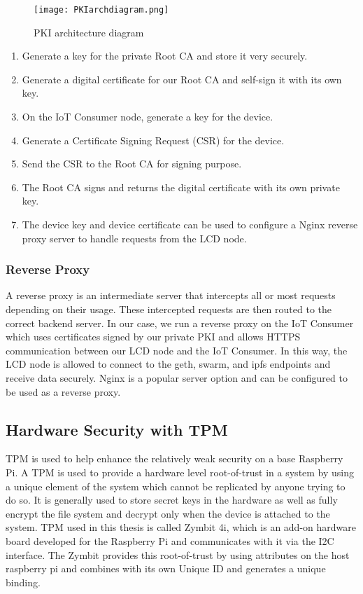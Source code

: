\documentclass[11pt,openright]{report}
\begin{document}
\begin{figure}
	\centering
	\texttt{[image: PKIarchdiagram.png]}
	\caption{PKI architecture diagram}
	\label{fig:pkiarch}
\end{figure}


\begin{enumerate}
	\item Generate a key for the private Root CA and store it very securely.
	\item Generate a digital certificate for our Root CA and self-sign it with its own key.
	\item On the IoT Consumer node, generate a key for the device.
	\item Generate a Certificate Signing Request (CSR) for the device.
	\item Send the CSR to the Root CA for signing purpose.
	\item The Root CA signs and returns the digital certificate with its own private key.
	\item The device key and device certificate can be used to configure a Nginx reverse proxy server to handle requests from the LCD node.
\end{enumerate}


\subsubsection{Reverse Proxy}
A reverse proxy is an intermediate server that intercepts all or most requests depending on their usage. These intercepted requests are then routed to the correct backend server. In our case, we run a reverse proxy on the IoT Consumer which uses certificates signed by our private PKI and allows HTTPS communication between our LCD node and the IoT Consumer. In this way, the LCD node is allowed to connect to the geth, swarm, and ipfs endpoints and receive data securely. Nginx is a popular server option and can be configured to be used as a reverse proxy.



\subsection{Hardware Security with TPM}
TPM is used to help enhance the relatively weak security on a base Raspberry Pi. A TPM is used to provide a hardware level root-of-trust in a system by using a unique element of the system which cannot be replicated by anyone trying to do so. It is generally used to store secret keys in the hardware as well as fully encrypt the file system and decrypt only when the device is attached to the system. TPM used in this thesis is called Zymbit 4i, which is an add-on hardware board developed for the Raspberry Pi and communicates with it via the I2C interface. The Zymbit provides this root-of-trust by using attributes on the host raspberry pi and combines with its own Unique ID and generates a unique binding.
\end{document}
